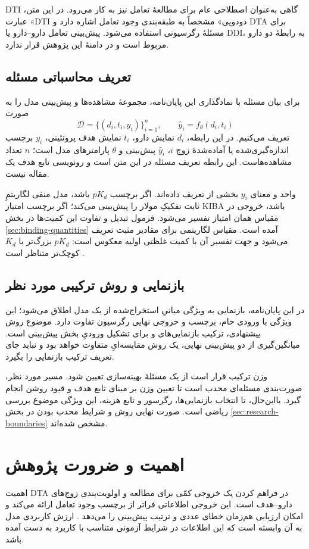 DTI گاهی به‌عنوان اصطلاحی عام برای مطالعهٔ تعامل نیز به کار می‌رود. در این متن، عبارت «DTI دودویی» مشخصاً به طبقه‌بندی وجود تعامل اشاره دارد و DTA برای مسئلهٔ رگرسیونی استفاده می‌شود. پیش‌بینی تعامل دارو--دارو یا DDI، به رابطهٔ دو دارو مربوط است و در دامنهٔ این پژوهش قرار ندارد.

\subsection{تعریف محاسباتی مسئله}
برای بیان مسئله با نمادگذاری این پایان‌نامه، مجموعهٔ مشاهده‌ها و پیش‌بینی مدل را به صورت
\begin{equation}
\mathcal{D}=\{(d_i,t_i,y_i)\}_{i=1}^{n},
\qquad
\widehat{y}_i=f_\theta(d_i,t_i)
\label{eq:dataset}
\end{equation}
تعریف می‌کنیم. در این رابطه، $d_i$ نمایش دارو، $t_i$ نمایش هدف پروتئینی، $y_i$ برچسب اندازه‌گیری‌شده یا آماده‌شدهٔ زوج $i$، $\widehat{y}_i$ پیش‌بینی و $\theta$ پارامترهای مدل است؛ $n$ تعداد مشاهده‌هاست. این رابطه تعریف مسئله در این متن است و رونویسی تابع هدف یک مقاله نیست.

واحد و معنای $y_i$ بخشی از تعریف داده‌اند. اگر برچسب $pK_d$ باشد، مدل منفی لگاریتمِ ثابت تفکیکِ مولار را پیش‌بینی می‌کند؛ اگر برچسب امتیاز KIBA باشد، خروجی در مقیاس همان امتیاز تفسیر می‌شود. فرمول تبدیل و تفاوت این کمیت‌ها در بخش \ref{sec:binding-quantities} آمده است. مقیاس لگاریتمی برای مقادیر مثبت تعریف می‌شود و جهت تفسیر آن با کمیت غلظتی اولیه معکوس است: $pK_d$ بزرگ‌تر با $K_d$ کوچک‌تر متناظر است \cite{Bento14ChEMBL,Ozturk18DeepDTA}.

\subsection{بازنمایی و روش ترکیبی مورد نظر}
در این پایان‌نامه، بازنمایی به ویژگی میانیِ استخراج‌شده از یک مدل اطلاق می‌شود؛ این ویژگی با ورودی خام، برچسب و خروجی نهایی رگرسیون تفاوت دارد. موضوع روش پیشنهادی، ترکیب بازنمایی‌های  و  برای تشکیل ورودیِ بخش پیش‌بینی است. میانگین‌گیری از دو پیش‌بینی نهایی، یک روش مقایسه‌ایِ متفاوت خواهد بود و نباید جای تعریف ترکیب بازنمایی را بگیرد.

وزن ترکیب قرار است از یک مسئلهٔ بهینه‌سازی تعیین شود. مسیر مورد نظر، صورت‌بندی مسئله‌ای محدب است تا تعیین وزن بر مبنای تابع هدف و قیود روشن انجام گیرد. بااین‌حال، تا انتخاب بازنمایی‌ها، رگرسور و تابع هزینه، این ویژگی موضوع بررسی ریاضی است. صورت نهایی روش و شرایط محدب بودن در بخش \ref{sec:research-boundaries} مشخص شده‌اند.

\section{اهمیت و ضرورت پژوهش}
\label{sec:ahammiyat}
اهمیت DTA در فراهم کردن یک خروجی کمّی برای مطالعه و اولویت‌بندی زوج‌های دارو--هدف است. این خروجی اطلاعاتی فراتر از برچسب وجود تعامل ارائه می‌کند و امکان ارزیابی هم‌زمان خطای عددی و ترتیب پیش‌بینی را می‌دهد \cite{Ozturk18DeepDTA}. ارزش کاربردی مدل به آن وابسته است که این اطلاعات در شرایط آزمونی متناسب با کاربرد به دست آمده باشد.

